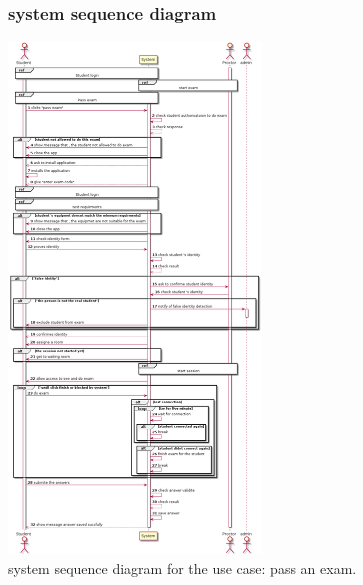 \documentclass[]{uc2pfecaneva}
\begin{document}
    \begin{figure}[]
        \subsubsection{system sequence diagram}
        \centering
        \includegraphics[width=0.6\textwidth]{images/pass_exam}

        \caption{system sequence diagram for the use case: pass an exam.}
    \end{figure}
    \clearpage
\end{document}
